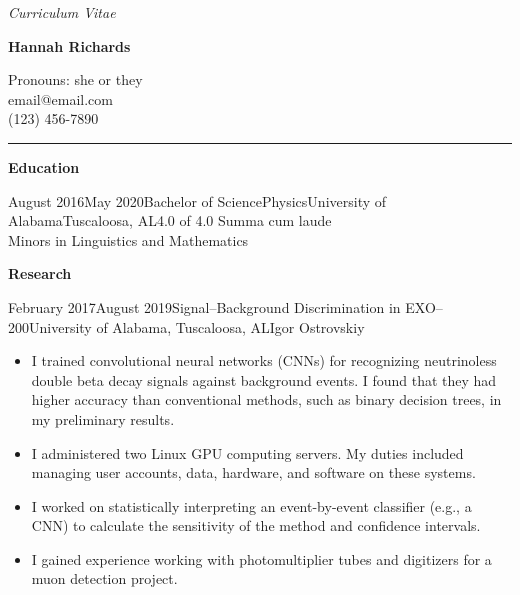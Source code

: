 \documentclass{cv}
\begin{document}
	\begin{center}
        \textit{Curriculum Vitae}\\
		{\Large \textbf{Hannah Richards}\par}
		Pronouns: she or they\\
		email@email.com\\
		(123) 456-7890
	\end{center}
	\vspace{-0.15in}
	\rule{\textwidth}{1pt}
	\vspace{0.05in}

%
%
%

	\textbf{Education}\\
	\begin{education}{August 2016}{May 2020}{Bachelor of Science}{Physics}{University of Alabama}{Tuscaloosa, AL}{4.0 of 4.0}
	    Summa cum laude\\
	    Minors in Linguistics and Mathematics\\
	\end{education}
	\vspace{0.2in}
	
%
%
%
	
	\textbf{Research}\\
	\begin{research_exp}{February 2017}{August 2019}{Signal--Background Discrimination in EXO--200}{University of Alabama, Tuscaloosa, AL}{Igor Ostrovskiy}
		\begin{itemize}
    	    \item I trained convolutional neural networks (CNNs) for recognizing neutrinoless double beta decay signals against background events. I found that they had higher accuracy than conventional methods, such as binary decision trees, in my preliminary results.
    	    \item I administered two Linux GPU computing servers. My duties included managing user accounts, data, hardware, and software on these systems.
    	    \item I worked on statistically interpreting an event-by-event classifier (e.g., a CNN) to calculate the sensitivity of the method and confidence intervals.
    	    \item I gained experience working with photomultiplier tubes and digitizers for a muon detection project.
        \end{itemize}
	\end{research_exp}
    
\end{document}
